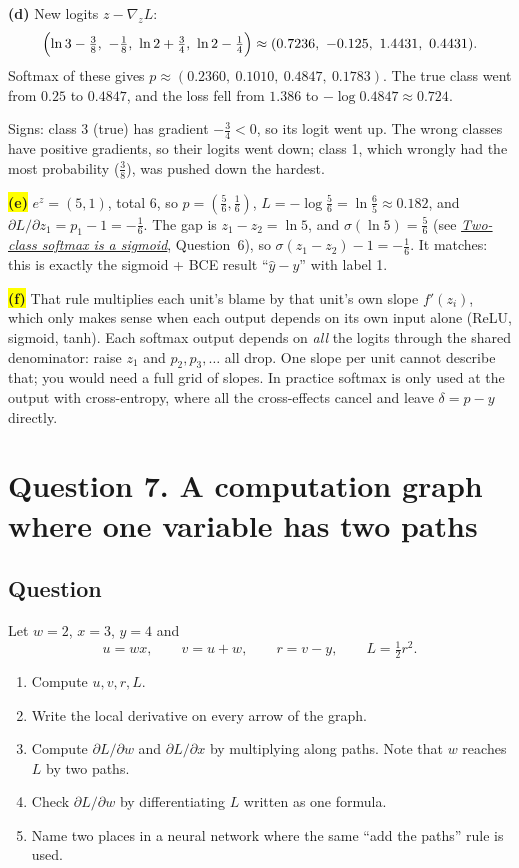 \documentclass[12pt,a4paper]{article}
\newcommand{\seeconcept}[3]{(see \hyperref[#1]{\textit{#2}}, Question~#3)}
\newcommand{\hlq}[1]{{\setlength{\fboxsep}{1.5pt}\colorbox{yellow}{#1}}}
\begin{document}
\textbf{(d)} New logits $z-\nabla_zL$:
\[
\Bigl(\ln3-\tfrac38,\ -\tfrac18,\ \ln2+\tfrac34,\ \ln2-\tfrac14\Bigr)\approx(0.7236,\ -0.125,\ 1.4431,\ 0.4431).
\]
Softmax of these gives $p\approx(0.2360,\ 0.1010,\ 0.4847,\ 0.1783)$. The true class went from $0.25$ to $0.4847$, and the loss fell from $1.386$ to $-\log0.4847\approx0.724$.

Signs: class 3 (true) has gradient $-\tfrac34<0$, so its logit went up. The wrong classes have positive gradients, so their logits went down; class 1, which wrongly had the most probability ($\tfrac38$), was pushed down the hardest.

\hlq{\textbf{(e)}} $e^z=(5,1)$, total 6, so $p=(\tfrac56,\tfrac16)$, $L=-\log\tfrac56=\ln\tfrac65\approx0.182$, and $\partial L/\partial z_1=p_1-1=-\tfrac16$. The gap is $z_1-z_2=\ln5$, and $\sigma(\ln5)=\tfrac{5}{6}$ \seeconcept{c:twoclass}{Two-class softmax is a sigmoid}{6}, so $\sigma(z_1-z_2)-1=-\tfrac16$. It matches: this is exactly the sigmoid + BCE result ``$\hat y-y$'' with label 1.

\hlq{\textbf{(f)}} That rule multiplies each unit's blame by that unit's own slope $f'(z_i)$, which only makes sense when each output depends on its own input alone (ReLU, sigmoid, tanh). Each softmax output depends on \emph{all} the logits through the shared denominator: raise $z_1$ and $p_2,p_3,\dots$ all drop. One slope per unit cannot describe that; you would need a full grid of slopes. In practice softmax is only used at the output with cross-entropy, where all the cross-effects cancel and leave $\delta=p-y$ directly.

\section{Question 7. A computation graph where one variable has two paths}
\subsection*{Question}
Let $w=2$, $x=3$, $y=4$ and
\[
u=wx,\qquad v=u+w,\qquad r=v-y,\qquad L=\tfrac12r^2 .
\]
\begin{enumerate}[label=(\alph*)]
\item Compute $u,v,r,L$.
\item Write the local derivative on every arrow of the graph.
\item Compute $\partial L/\partial w$ and $\partial L/\partial x$ by multiplying along paths. Note that $w$ reaches $L$ by two paths.
\item Check $\partial L/\partial w$ by differentiating $L$ written as one formula.
\item Name two places in a neural network where the same ``add the paths'' rule is used.
\end{enumerate}
\end{document}
